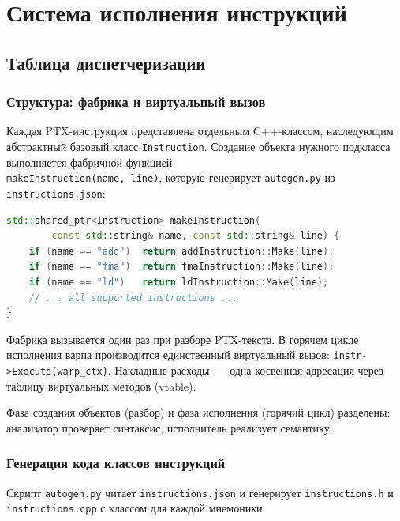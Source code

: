 \section{Система исполнения инструкций}

\subsection{Таблица диспетчеризации}

\subsubsection{Структура: фабрика и виртуальный вызов}

Каждая PTX-инструкция представлена отдельным C++-классом,
наследующим абстрактный базовый класс \texttt{Instruction}.
Создание объекта нужного подкласса выполняется фабричной функцией \\
\texttt{makeInstruction(name, line)}, которую генерирует
\texttt{autogen.py} из \\\texttt{instructions.json}:

\begin{lstlisting}[language=C++, caption={Фрагмент автогенерируемой фабрики}]
std::shared_ptr<Instruction> makeInstruction(
        const std::string& name, const std::string& line) {
    if (name == "add")  return addInstruction::Make(line);
    if (name == "fma")  return fmaInstruction::Make(line);
    if (name == "ld")   return ldInstruction::Make(line);
    // ... all supported instructions ...
}
\end{lstlisting}

Фабрика вызывается один раз при разборе PTX-текста. В горячем цикле
исполнения варпа производится единственный виртуальный вызов:
\texttt{instr->Execute(warp\_ctx)}.
Накладные расходы~--- одна косвенная адресация через таблицу виртуальных методов (vtable).

Фаза создания объектов (разбор) и фаза исполнения (горячий цикл)
разделены: анализатор проверяет синтаксис, исполнитель реализует семантику.

\subsubsection{Генерация кода классов инструкций}

Скрипт \texttt{autogen.py} читает \texttt{instructions.json}
и генерирует \texttt{instructions.h} и \texttt{instructions.cpp}
с классом для каждой мнемоники.

